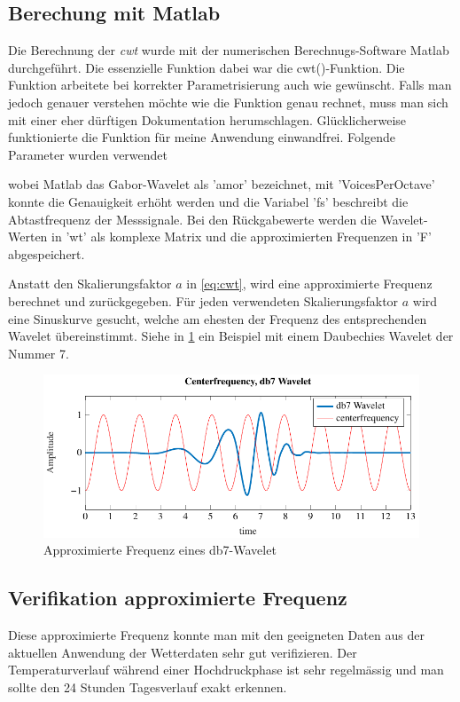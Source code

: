 \begin{refsection}
\newpage
\subsection{Berechung mit Matlab}
Die Berechnung der \textit{cwt} wurde mit der numerischen Berechnugs-Software Matlab durchgeführt.
Die essenzielle Funktion dabei war die cwt()-Funktion.
Die Funktion arbeitete bei korrekter Parametrisierung auch wie gewünscht.
Falls man jedoch genauer verstehen möchte wie die Funktion genau rechnet, muss man sich mit einer eher dürftigen Dokumentation herumschlagen.
Glücklicherweise funktionierte die Funktion für meine Anwendung einwandfrei.
Folgende Parameter wurden verwendet

\label{fig:matlab_code_cwt}
wobei Matlab das Gabor-Wavelet als 'amor' bezeichnet, mit 'VoicesPerOctave' konnte die Genauigkeit erhöht werden und die Variabel 'fs' beschreibt die Abtastfrequenz der Messsignale.
Bei den Rückgabewerte werden die Wavelet-Werten in 'wt' als komplexe Matrix und die approximierten Frequenzen in 'F' abgespeichert.

Anstatt den Skalierungsfaktor $a$ in \ref{eq:cwt}, wird eine approximierte Frequenz berechnet und zurückgegeben.
Für jeden verwendeten Skalierungsfaktor $a$ wird eine Sinuskurve gesucht, welche am ehesten der Frequenz des entsprechenden Wavelet übereinstimmt.
Siehe in \ref{fig:centerf} ein Beispiel mit einem Daubechies Wavelet der Nummer 7.
\begin{figure}[h]
	\centering
	\includegraphics[width=1\textwidth]{papers/wwt/images/centerf.pdf}
	\caption{Approximierte Frequenz eines db7-Wavelet}
	\label{fig:centerf}
\end{figure}


\newpage
\subsection{Verifikation approximierte Frequenz}
Diese approximierte Frequenz konnte man mit den geeigneten Daten aus der aktuellen Anwendung der Wetterdaten sehr gut verifizieren.
Der Temperaturverlauf während einer Hochdruckphase ist sehr regelmässig und man sollte den 24 Stunden Tagesverlauf exakt erkennen.


\end{refsection}
